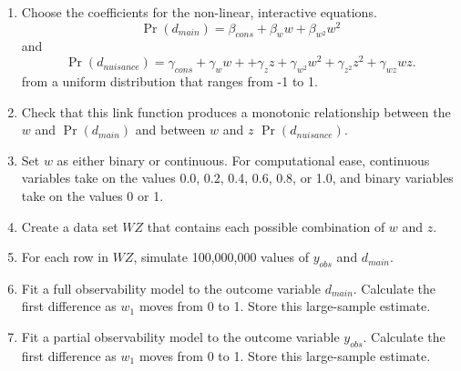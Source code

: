 \documentclass[10pt]{article}
\begin{document}
\begin{enumerate}
\item Choose the coefficients for the non-linear, interactive equations.
\begin{equation}
\Pr(d_{main}) = \beta_{cons} + \beta_w w + \beta_{w^2} w^2 \nonumber
\end{equation}
and 
\begin{equation}
\Pr(d_{nuisance}) = \gamma_{cons} + \gamma_w w + + \gamma_z z + \gamma_{w^2} w^2 + \gamma_{z^2} z^2 + \gamma_{wz} wz \text{.}\nonumber
\end{equation}
from a uniform distribution that ranges from -1 to 1.
\item Check that this link function produces a monotonic relationship between the $w$ and $\Pr(d_{main})$ and between $w$ and $z$ $\Pr(d_{nuisance})$. 
\item Set $w$ as either binary or continuous. For computational ease, continuous variables take on the values 0.0, 0.2, 0.4, 0.6, 0.8, or 1.0, and binary variables take on the values 0 or 1.
\item Create a data set $WZ$ that contains each possible combination of $w$ and $z$. 
\item For each row in $WZ$, simulate 100,000,000 values of $y_{obs}$ and $d_{main}$.
\item Fit a full observability model to the outcome variable $d_{main}$. Calculate the first difference as $w_1$ moves from 0 to 1. Store this large-sample estimate.
\item Fit a partial observability model to the outcome variable $y_{obs}$. Calculate the first difference as $w_1$ moves from 0 to 1. Store this large-sample estimate.
\end{enumerate}
\end{document}
